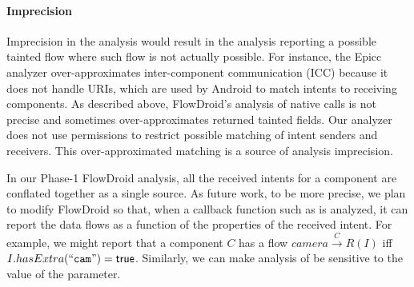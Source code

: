 {%
\noindent\paragraph{Imprecision} \label{subsec:imprecision}
Imprecision in the analysis would result in the analysis
reporting a possible tainted flow where such flow is not
actually possible. For instance, the Epicc analyzer over-approximates
inter-component communication (ICC) because it does not handle URIs,
which are used by Android to match intents to receiving components. 
As described above, FlowDroid's analysis of native calls is not precise and sometimes over-approximates returned tainted fields. 
Our analyzer does not use permissions to restrict possible matching of intent senders and receivers. This over-approximated matching is a source of analysis imprecision.

In our Phase-1 FlowDroid analysis, all the received intents for a component are
conflated together as a single source.  As future work, to be more precise, 
we plan to modify FlowDroid so that, when a callback function such as
 is analyzed, it can report the data flows as a function of the
properties of the received intent. For example, we might report that
a component $C$ has a flow $camera \xrightarrow{C} R(I)$ iff 
$I.hasExtra(\textrm{``}\texttt{cam}\textrm{''}) = \textsf{true}$.
Similarly, we can make analysis of  be sensitive
to the value of the  parameter.



}
